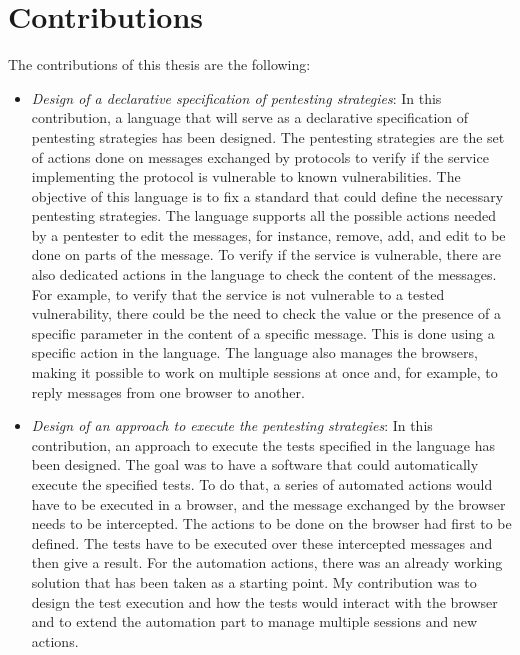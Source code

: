 \section{Contributions}
\label{sec:contributions}
The contributions of this thesis are the following:
\begin{itemize}
    \item \textit{Design of a declarative specification of pentesting strategies}: In this contribution, a language that will serve as a declarative specification of pentesting strategies has been designed. The pentesting strategies are the set of actions done on messages exchanged by protocols to verify if the service implementing the protocol is vulnerable to known vulnerabilities. The objective of this language is to fix a standard that could define the necessary pentesting strategies. The language supports all the possible actions needed by a pentester to edit the messages, for instance, remove, add, and edit to be done on parts of the message. To verify if the service is vulnerable, there are also dedicated actions in the language to check the content of the messages. For example, to verify that the service is not vulnerable to a tested vulnerability, there could be the need to check the value or the presence of a specific parameter in the content of a specific message. This is done using a specific action in the language. The language also manages the browsers, making it possible to work on multiple sessions at once and, for example, to reply messages from one browser to another.
    \item \textit{Design of an approach to execute the pentesting strategies}: In this contribution, an approach to execute the tests specified in the language has been designed. The goal was to have a software that could automatically execute the specified tests. To do that, a series of automated actions would have to be executed in a browser, and the message exchanged by the browser needs to be intercepted. The actions to be done on the browser had first to be defined. The tests have to be executed over these intercepted messages and then give a result. For the automation actions, there was an already working solution \cite{wendy_barreto, claudio_grisenti} that has been taken as a starting point. My contribution was to design the test execution and how the tests would interact with the browser and to extend the automation part to manage multiple sessions and new actions.

\end{itemize}
